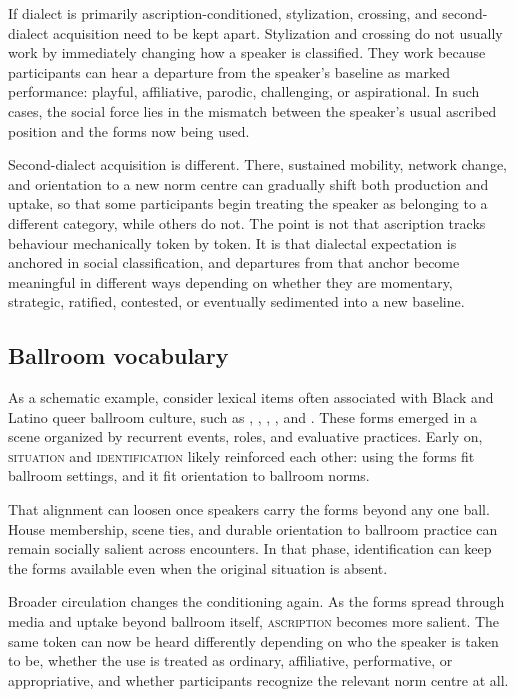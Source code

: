 \documentclass[11pt,letterpaper]{article}
\begin{document}
If dialect is primarily ascription-conditioned, stylization, crossing, and second-dialect acquisition need to be kept apart. Stylization and crossing do not usually work by immediately changing how a speaker is classified. They work because participants can hear a departure from the speaker's baseline as marked performance: playful, affiliative, parodic, challenging, or aspirational. In such cases, the social force lies in the mismatch between the speaker's usual ascribed position and the forms now being used.

Second-dialect acquisition is different. There, sustained mobility, network change, and orientation to a new norm centre can gradually shift both production and uptake, so that some participants begin treating the speaker as belonging to a different category, while others do not. The point is not that ascription tracks behaviour mechanically token by token. It is that dialectal expectation is anchored in social classification, and departures from that anchor become meaningful in different ways depending on whether they are momentary, strategic, ratified, contested, or eventually sedimented into a new baseline.

\subsection{Ballroom vocabulary}

As a schematic example, consider lexical items often associated with Black and Latino queer ballroom culture, such as , , , , and . These forms emerged in a scene organized by recurrent events, roles, and evaluative practices. Early on, \textsc{situation} and \textsc{identification} likely reinforced each other: using the forms fit ballroom settings, and it fit orientation to ballroom norms.

That alignment can loosen once speakers carry the forms beyond any one ball. House membership, scene ties, and durable orientation to ballroom practice can remain socially salient across encounters. In that phase, identification can keep the forms available even when the original situation is absent.

Broader circulation changes the conditioning again. As the forms spread through media and uptake beyond ballroom itself, \textsc{ascription} becomes more salient. The same token can now be heard differently depending on who the speaker is taken to be, whether the use is treated as ordinary, affiliative, performative, or appropriative, and whether participants recognize the relevant norm centre at all.
\end{document}
